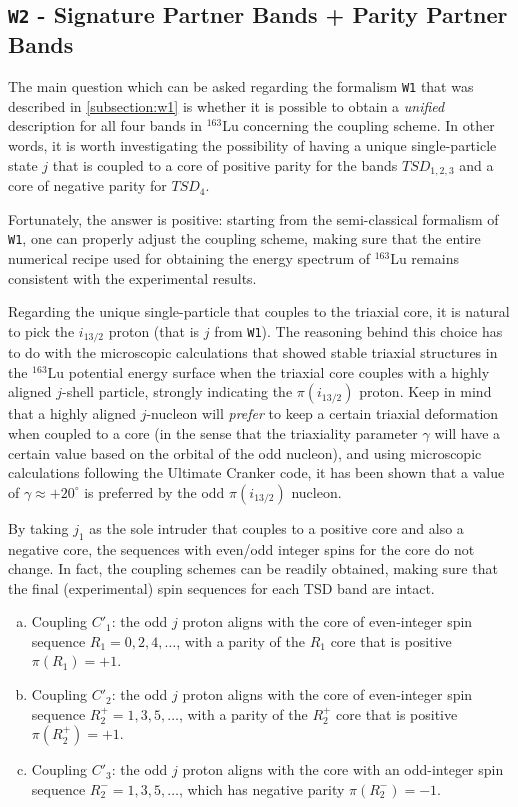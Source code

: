 \documentclass[11pt]{article}
\begin{document}
\subsection{\texttt{W2} - Signature Partner Bands + Parity Partner Bands}
\label{subsection:w2}

The main question which can be asked regarding the formalism \texttt{W1} that was described in \ref{subsection:w1} is whether it is possible to obtain a \emph{unified} description for all four bands in $^{163}$Lu concerning the coupling scheme. In other words, it is worth investigating the possibility of having a unique single-particle state $j$ that is coupled to a core of positive parity for the bands $TSD_{1,2,3}$ and a core of negative parity for $TSD_4$.

Fortunately, the answer is positive: starting from the semi-classical formalism of \texttt{W1}, one can properly adjust the coupling scheme, making sure that the entire numerical recipe used for obtaining the energy spectrum of $^{163}$Lu remains consistent with the experimental results.

Regarding the unique single-particle that couples to the triaxial core, it is natural to pick the $i_{13/2}$ proton (that is $j$ from \texttt{W1}). The reasoning behind this choice has to do with the microscopic calculations \cite{jensen2002wobbling,hagemann2003quantized,jensen2004coexisting} that showed stable triaxial structures in the $^{163}$Lu potential energy surface when the triaxial core couples with a highly aligned $j$-shell particle, strongly indicating the $\pi(i_{13/2})$ proton. Keep in mind that a highly aligned $j$-nucleon will \emph{prefer} to keep a certain triaxial deformation when coupled to a core \cite{hamamoto1983intrinsic,hamamoto1987rotational,hamamoto2016interplay} (in the sense that the triaxiality parameter $\gamma$ will have a certain value based on the orbital of the odd nucleon), and using microscopic calculations following the Ultimate Cranker code, it has been shown that a value of $\gamma\approx+20^\circ$ is preferred by the odd $\pi(i_{13/2})$ nucleon.

By taking $j_1$ as the sole intruder that couples to a positive core and also a negative core, the sequences with even/odd integer spins for the core do not change. In fact, the coupling schemes can be readily obtained, making sure that the final (experimental) spin sequences for each TSD band are intact. 

\begin{enumerate}[(a)]
    \item Coupling $C'_1$: the odd $j$ proton aligns with the core of even-integer spin sequence $R_1=0,2,4,\dots$, with a parity of the $R_1$ core that is positive $\pi(R_1)=+1$.
    \item Coupling $C'_2$: the odd $j$ proton aligns with the core of even-integer spin sequence $R_2^+=1,3,5,\dots$, with a parity of the $R_2^+$ core that is positive $\pi(R_2^+)=+1$.
    \item Coupling $C'_3$: the odd $j$ proton aligns with the core with an odd-integer spin sequence $R_2^-=1,3,5,\dots$, which has negative parity $\pi(R_2^-)=-1$.
\end{enumerate}
\end{document}
